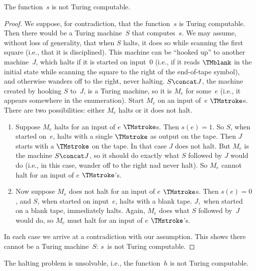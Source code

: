 \documentclass[../../../include/open-logic-section]{subfiles}
\begin{document}
\begin{lem}
The function~$s$ is not Turing computable.
\end{lem}

\begin{proof}
We suppose, for contradiction, that the function~$s$ is Turing
computable.  Then there would be a Turing machine~$S$ that
computes~$s$. We may assume, without loss of generality, that when $S$
halts, it does so while scanning the first square (i.e., that it is
disciplined).  This machine can be ``hooked up'' to another
machine~$J$, which halts if it is started on input~$0$ (i.e., if it
reads $\TMblank$ in the initial state while scanning the square to the
right of the end-of-tape symbol), and otherwise wanders off to the
right, never halting. $S \concat J$, the machine created by hooking
$S$ to~$J$, is a Turing machine, so it is $M_e$ for some~$e$ (i.e., it
appears somewhere in the enumeration). Start $M_e$ on an input of~$e$
$\TMstroke$s. There are two possibilities: either $M_e$ halts or it
does not halt.
\begin{enumerate}
\item Suppose $M_e$ halts for an input of $e$ $\TMstroke$s. Then $s(e)
  = 1$. So $S$, when started on~$e$, halts with a single $\TMstroke$
  as output on the tape.  Then $J$ starts with a $\TMstroke$ on the
  tape. In that case $J$ does not halt. But $M_e$ is the machine $S
  \concat J$, so it should do exactly what $S$ followed by $J$ would
  do (i.e., in this case, wander off to the right nad never halt).  So
  $M_e$ cannot halt for an input of $e$ $\TMstroke$'s.

\item Now suppose $M_e$ does not halt for an input of $e$
  $\TMstroke$s.  Then $s(e) = 0$, and $S$, when started on input~$e$,
  halts with a blank tape.  $J$,~when started on a blank tape,
  immediately halts.  Again, $M_e$ does what $S$ followed by~$J$ would
  do, so $M_e$ must halt for an input of $e$ $\TMstroke$'s.
\end{enumerate}
In each case we arrive at a contradiction with our assumption. This
shows there cannot be a Turing machine~$S$: $s$~is not Turing
computable.
\end{proof}

\begin{thm}
 The halting problem is unsolvable, i.e.,
the function~$h$ is not Turing computable.
\end{thm}
\end{document}
